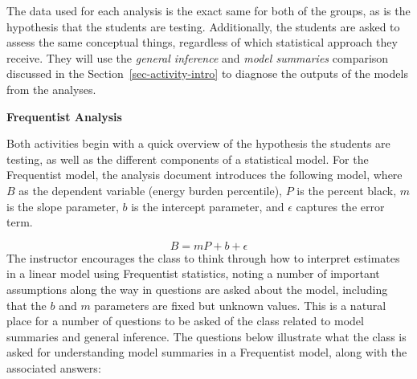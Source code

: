 \documentclass[
  12pt,
  letterpaper,
  DIV=11,
  numbers=noendperiod]{scrartcl}
\begin{document}
The data used for each analysis is the exact same for both of the
groups, as is the hypothesis that the students are testing.
Additionally, the students are asked to assess the same conceptual
things, regardless of which statistical approach they receive. They will
use the \emph{general inference} and \emph{model summaries} comparison
discussed in the Section~\ref{sec-activity-intro} to diagnose the
outputs of the models from the analyses.

\textbf{Frequentist Analysis}

Both activities begin with a quick overview of the hypothesis the
students are testing, as well as the different components of a
statistical model. For the Frequentist model, the analysis document
introduces the following model, where \(B\) as the dependent variable
(energy burden percentile), \(P\) is the percent black, \(m\) is the
slope parameter, \(b\) is the intercept parameter, and \(\epsilon\)
captures the error term.

\[{B = m P + b + \epsilon}\] The instructor encourages the class to
think through how to interpret estimates in a linear model using
Frequentist statistics, noting a number of important assumptions along
the way in questions are asked about the model, including that the \(b\)
and \(m\) parameters are fixed but unknown values. This is a natural
place for a number of questions to be asked of the class related to
model summaries and general inference. The questions below illustrate
what the class is asked for understanding model summaries in a
Frequentist model, along with the associated answers:
\end{document}
